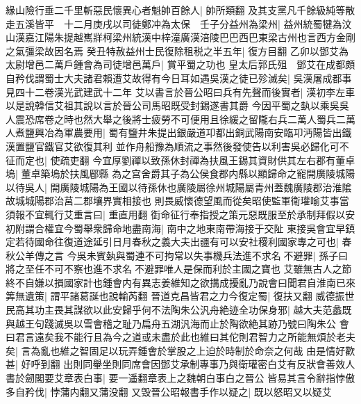緣山險行垂二千里斬惡民懷異心者魁帥百餘人|{
	帥所類翻}
及其支黨凡千餘級純等散走五溪皆平　十二月庚戌以司徒鄭冲為太保　壬子分益州為梁州|{
	益州統蜀犍為汶山漢嘉江陽朱提越嶲牂柯梁州統漢中梓潼廣漢涪陵巴巴西巴東梁古州也言西方金剛之氣彊梁故因名焉}
癸丑特赦益州士民復除租税之半五年|{
	復方目翻}
乙卯以鄧艾為太尉增邑二萬戶鍾會為司徒增邑萬戶|{
	賞平蜀之功也}
皇太后郭氏殂　鄧艾在成都頗自矜伐謂蜀士大夫諸君賴遭艾故得有今日耳如遇吳漢之徒已殄滅矣|{
	吳漢屠成都事見四十二卷漢光武建武十二年}
艾以書言於晉公昭曰兵有先聲而後實者|{
	漢初李左車以是說韓信艾祖其說以言於晉公司馬昭既受封錫遂書其爵}
今因平蜀之埶以乘吳吳人震恐席卷之時也然大舉之後將士疲勞不可便用且徐緩之留隴右兵二萬人蜀兵二萬人煮鹽興冶為軍農要用|{
	蜀有鹽井朱提出銀嚴道卭都出銅武陽南安臨卭沔陽皆出鐵漢置鹽官鐵官艾欲復其利}
並作舟船豫為順流之事然後發使告以利害吳必歸化可不征而定也|{
	使疏吏翻}
今宜厚劉禪以致孫休封禪為扶風王錫其資財供其左右郡有董卓塢|{
	董卓築塢於扶風郿縣}
為之宫舍爵其子為公侯食郡内縣以顯歸命之寵開廣陵城陽以待吳人|{
	開廣陵城陽為王國以待孫休也廣陵屬徐州城陽屬青州蓋魏廣陵郡治淮隂故城城陽郡治莒二郡壤界實相接也}
則畏威懷德望風而從矣昭使監軍衛瓘喻艾事當須報不宜輒行艾重言曰|{
	重直用翻}
衘命征行奉指授之策元惡既服至於承制拜假以安初附謂合權宜今蜀舉衆歸命地盡南海|{
	南中之地東南帶海接于交阯}
東接吳會宜早鎮定若待國命往復道途延引日月春秋之義大夫出疆有可以安社稷利國家專之可也|{
	春秋公羊傳之言}
今吳未賓埶與蜀連不可拘常以失事機兵法進不求名不避罪|{
	孫子曰將之至任不可不察也進不求名不避罪唯人是保而利於主國之寶也}
艾雖無古人之節終不自嫌以損國家計也鍾會内有異志姜維知之欲搆成擾亂乃說會曰聞君自淮南已來筭無遺策|{
	謂平諸葛誕也說輸芮翻}
晉道克昌皆君之力今復定蜀|{
	復扶又翻}
威德振世民高其功主畏其謀欲以此安歸乎何不法陶朱公汎舟絶迹全功保身邪|{
	越大夫范蠡既與越王句踐滅吳以雪會稽之耻乃扁舟五湖汎海而止於陶欲絶其跡乃號曰陶朱公}
會曰君言遠矣我不能行且為今之道或未盡於此也維曰其佗則君智力之所能無煩於老夫矣|{
	言為亂也維之智固足以玩弄鍾會於掌股之上迫於時制於命奈之何哉}
由是情好歡甚|{
	好呼到翻}
出則同轝坐則同席會因鄧艾承制專事乃與衛瓘密白艾有反狀會善效人書於劒閣要艾章表白事|{
	要一遥翻章表上之魏朝白事白之晉公}
皆易其言令辭指悖傲多自矜伐|{
	悖蒲内翻又蒲没翻}
又毁晉公昭報書手作以疑之|{
	既以怒昭又以疑艾}


